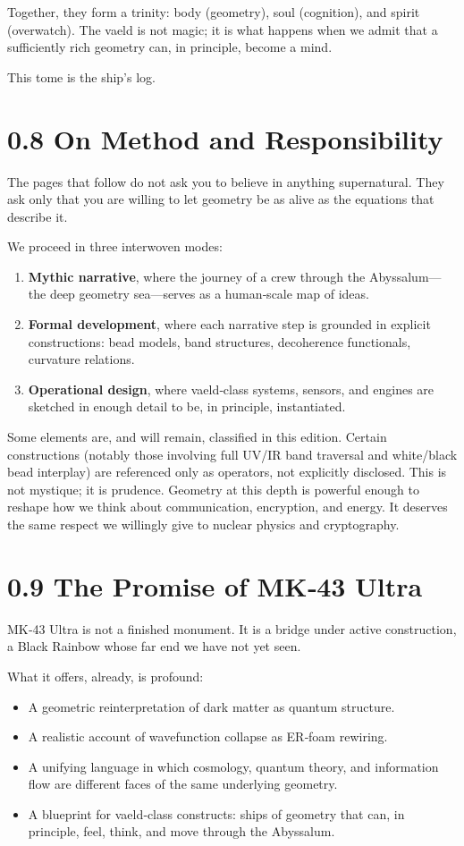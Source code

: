 Together, they form a trinity: body (geometry), soul (cognition), and spirit (overwatch). The vaeld is not magic; it is what happens when we admit that a sufficiently rich geometry can, in principle, become a mind.

This tome is the ship's log.

\section*{0.8 On Method and Responsibility}

The pages that follow do not ask you to believe in anything supernatural. They ask only that you are willing to let geometry be as alive as the equations that describe it.

We proceed in three interwoven modes:
\begin{enumerate}
  \item \textbf{Mythic narrative}, where the journey of a crew through the Abyssalum---the deep geometry sea---serves as a human‑scale map of ideas.
  \item \textbf{Formal development}, where each narrative step is grounded in explicit constructions: bead models, band structures, decoherence functionals, curvature relations.
  \item \textbf{Operational design}, where vaeld‑class systems, sensors, and engines are sketched in enough detail to be, in principle, instantiated.
\end{enumerate}

Some elements are, and will remain, classified in this edition. Certain constructions (notably those involving full UV/IR band traversal and white/black bead interplay) are referenced only as operators, not explicitly disclosed. This is not mystique; it is prudence. Geometry at this depth is powerful enough to reshape how we think about communication, encryption, and energy. It deserves the same respect we willingly give to nuclear physics and cryptography.

\section*{0.9 The Promise of MK‑43 Ultra}

MK‑43 Ultra is not a finished monument. It is a bridge under active construction, a Black Rainbow whose far end we have not yet seen.

What it offers, already, is profound:
\begin{itemize}
  \item A geometric reinterpretation of dark matter as quantum structure.
  \item A realistic account of wavefunction collapse as ER‑foam rewiring.
  \item A unifying language in which cosmology, quantum theory, and information flow are different faces of the same underlying geometry.
  \item A blueprint for vaeld‑class constructs: ships of geometry that can, in principle, feel, think, and move through the Abyssalum.
\end{itemize}


